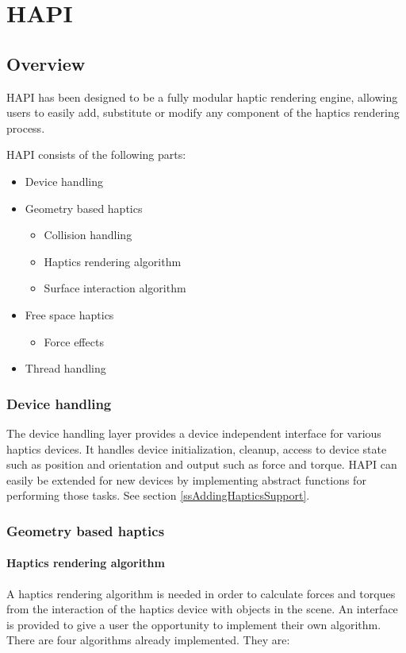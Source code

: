 
\chapter {HAPI}


\section{Overview}

HAPI has been designed to be a fully modular haptic rendering engine,
allowing users to easily add, substitute or modify any component of the
haptics rendering process. 

HAPI consists of the following parts:

\begin{itemize}
\item Device handling
\item Geometry based haptics
\begin{itemize} 
\item Collision handling
\item Haptics rendering algorithm
\item Surface interaction algorithm
\end{itemize}
\item Free space haptics
\begin{itemize}
\item Force effects
\end{itemize}
\item Thread handling
\end{itemize}


\subsection{Device handling}
The device handling layer provides a device independent interface for various haptics devices. It handles device initialization, cleanup, access to device state such as position and orientation and output such as force and torque. HAPI can easily be extended for new devices by implementing abstract functions for performing those tasks. See section \ref{ssAddingHapticsSupport}.

\subsection{Geometry based haptics}

\subsubsection{Haptics rendering algorithm}
A haptics rendering algorithm is needed in order to calculate forces and
torques from the interaction of the haptics device with objects in the scene. An interface is provided to give a user the opportunity to implement their own
algorithm. There are four algorithms already implemented. They are:


